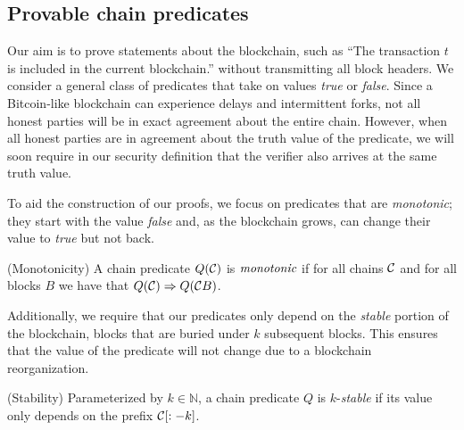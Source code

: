 \subsection{Provable chain predicates}

Our aim is to prove statements about the blockchain, such as ``The transaction
$t$ is included in the current blockchain.'' without transmitting all block
headers. We consider a general class of predicates that take on values
\emph{true} or \emph{false}.  Since a Bitcoin-like blockchain can experience
delays and intermittent forks, not all honest parties will be in exact agreement
about the entire chain. However, when all honest parties are in agreement about
the truth value of the predicate, we will soon require in our security
definition that the verifier also arrives at the same truth value.

To aid the construction of our proofs, we focus on predicates that are
\emph{monotonic}; they start with the value \emph{false} and, as the blockchain
grows, can change their value to \emph{true} but not back.

\begin{definition}{(Monotonicity)}
    A chain predicate $Q(\mathcal{C})$ is $\emph{monotonic}$ if for all chains
    $\mathcal{C}$ and for all blocks $B$ we have that
    $Q(\mathcal{C}) \Rightarrow Q(\mathcal{C} B)$.
\end{definition}

Additionally, we require that our predicates only depend on the \emph{stable}
portion of the blockchain, blocks that are buried under $k$ subsequent blocks.
This ensures that the value of the predicate will not change due to a blockchain
reorganization.

\begin{definition}{(Stability)}
    Parameterized by $k \in \mathbb{N}$, a chain predicate $Q$ is
    $k$-\emph{stable} if its value only depends on the prefix $\mathcal{C}[:-k]$.
\end{definition}

